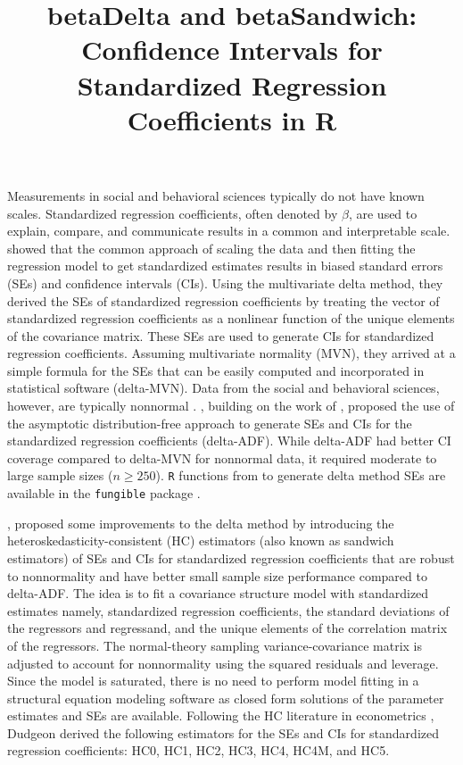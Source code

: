 \documentclass[man]{apa7}\usepackage[]{graphicx}\usepackage[]{xcolor}
\title{betaDelta and betaSandwich: Confidence Intervals for Standardized Regression Coefficients in R}
\begin{document}
\maketitle
Measurements in social and behavioral sciences typically do not have known scales.
Standardized regression coefficients,
often denoted by $\beta$,
are used to explain,
compare,
and communicate results in a common and interpretable scale.
\Textcite{Lib-Regression-Standardized-Coefficients-Delta-Yuan-2011}
showed that the common approach
of scaling the data
and then fitting the regression model to get standardized estimates
results in biased standard errors (SEs)
and confidence intervals (CIs).
Using the multivariate delta method,
they derived the SEs
of standardized regression coefficients
by treating the vector of standardized regression coefficients
as a nonlinear function of the unique elements of the covariance matrix.
These SEs are used to generate CIs for standardized regression coefficients.
Assuming multivariate normality (MVN),
they arrived at a simple formula for the SEs that can be easily computed
and incorporated in statistical software
(delta-MVN).
Data from the social and behavioral sciences,
however,
are typically nonnormal
\parencite{Lib-Nonnormality-Micceri-1989}.
\Textcite{Lib-Regression-Standardized-Coefficients-Delta-Jones-2015},
building on the work of
\Textcite{Lib-Regression-Standardized-Coefficients-Delta-Yuan-2011},
proposed the use of the asymptotic distribution-free
\parencite[ADF:][]{Lib-Structural-Equation-Modeling-ADF-Browne-1984}
approach
to generate SEs and CIs for the standardized regression coefficients
(delta-ADF).
While delta-ADF had better CI coverage compared to delta-MVN for nonnormal data,
it required moderate to large sample sizes ($n \geq 250$).
\texttt{R} functions from \Textcite{Lib-Regression-Standardized-Coefficients-Delta-Jones-2015} to generate delta method SEs are available in the \texttt{fungible} package \parencite{Lib-R-Packages-fungible-2022}.

\Textcite{Lib-Regression-Standardized-Coefficients-HC-Dudgeon-2017},
proposed some improvements to the delta method
by introducing the heteroskedasticity-consistent (HC) estimators
(also known as sandwich estimators)
of SEs and CIs for standardized regression coefficients
that are robust to nonnormality and have better small sample size performance
compared to delta-ADF.
The idea is to fit a covariance structure model
with standardized estimates
namely,
standardized regression coefficients,
the standard deviations of the regressors and regressand,
and the unique elements of the correlation matrix of the regressors.
The normal-theory sampling variance-covariance matrix
is adjusted to account for nonnormality
using the squared residuals and leverage.
Since the model is saturated,
there is no need to perform model fitting
in a structural equation modeling software
as closed form solutions of the parameter estimates and SEs are available.
Following the HC literature in econometrics
\parencite[e.g.,][]{Lib-Regression-Heteroskedasticity-Consistent-Standard-Errors-White-1980,
Lib-Regression-Heteroskedasticity-Consistent-Standard-Errors-Cribari-Neto-2007},
Dudgeon
derived the following estimators
for the SEs and CIs for standardized regression coefficients:
HC0, HC1, HC2, HC3, HC4, HC4M, and HC5.
\end{document}
